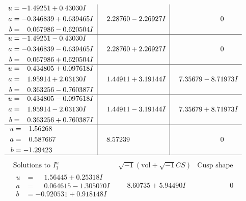 \documentclass[1p]{elsarticle_modified}
\theoremstyle{definition}
\newcommand{\I}{\sqrt{-1}}
\begin{document}
$$\begin{array}{c|c|c}
\begin{aligned}
u &= -1.49251 + 0.43030 I \\
a &= -0.346839 + 0.639465 I \\
b &= \phantom{-}0.067986 - 0.620504 I\end{aligned}
 & \phantom{-}2.28760 - 2.26927 I & \phantom{-0.000000 } 0 \\ \hline\begin{aligned}
u &= -1.49251 - 0.43030 I \\
a &= -0.346839 - 0.639465 I \\
b &= \phantom{-}0.067986 + 0.620504 I\end{aligned}
 & \phantom{-}2.28760 + 2.26927 I & \phantom{-0.000000 } 0 \\ \hline\begin{aligned}
u &= \phantom{-}0.434805 + 0.097618 I \\
a &= \phantom{-}1.95914 + 2.03130 I \\
b &= \phantom{-}0.363256 - 0.760387 I\end{aligned}
 & \phantom{-}1.44911 + 3.19144 I & \phantom{-}7.35679 - 8.71973 I \\ \hline\begin{aligned}
u &= \phantom{-}0.434805 - 0.097618 I \\
a &= \phantom{-}1.95914 - 2.03130 I \\
b &= \phantom{-}0.363256 + 0.760387 I\end{aligned}
 & \phantom{-}1.44911 - 3.19144 I & \phantom{-}7.35679 + 8.71973 I \\ \hline\begin{aligned}
u &= \phantom{-}1.56268\phantom{ +0.000000I} \\
a &= \phantom{-}0.587667\phantom{ +0.000000I} \\
b &= -1.29423\phantom{ +0.000000I}\end{aligned}
 & \phantom{-}8.57239\phantom{ +0.000000I} & \phantom{-0.000000 } 0\\
 \hline 
 \end{array}$$\newpage$$\begin{array}{c|c|c}  
\text{Solutions to }I^u_{1}& \I (\text{vol} + \sqrt{-1}CS) & \text{Cusp shape}\\
 \hline 
\begin{aligned}
u &= \phantom{-}1.56445 + 0.25318 I \\
a &= \phantom{-}0.064615 - 1.305070 I \\
b &= -0.920531 + 0.918148 I\end{aligned}
 & \phantom{-}8.60735 + 5.94490 I & \phantom{-0.000000 } 0 \\ \hline\begin{aligned}

\end{aligned}
\end{array}$$
\end{document}
